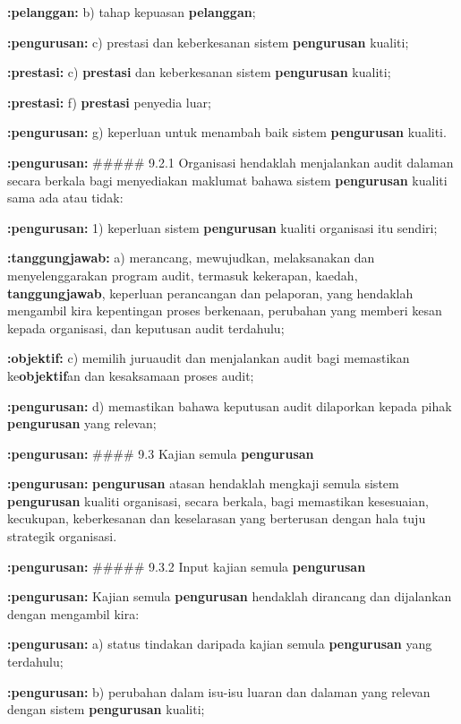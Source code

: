 \documentclass{article}
\begin{document}
\textbf{:pelanggan:} b) tahap kepuasan \textbf{pelanggan};

\textbf{:pengurusan:} c) prestasi dan keberkesanan sistem \textbf{pengurusan} kualiti;

\textbf{:prestasi:} c) \textbf{prestasi} dan keberkesanan sistem \textbf{pengurusan} kualiti;

\textbf{:prestasi:} f) \textbf{prestasi} penyedia luar;

\textbf{:pengurusan:} g) keperluan untuk menambah baik sistem \textbf{pengurusan} kualiti.

\textbf{:pengurusan:} \#\#\#\#\# 9.2.1 Organisasi hendaklah menjalankan audit dalaman secara berkala bagi menyediakan
maklumat bahawa sistem \textbf{pengurusan} kualiti sama ada atau tidak:

\textbf{:pengurusan:} 1) keperluan sistem \textbf{pengurusan} kualiti organisasi itu sendiri;

\textbf{:tanggungjawab:} a) merancang, mewujudkan, melaksanakan dan menyelenggarakan program audit,
termasuk kekerapan, kaedah, \textbf{tanggungjawab}, keperluan perancangan dan pelaporan,
yang hendaklah mengambil kira kepentingan proses berkenaan, perubahan yang
memberi kesan kepada organisasi, dan keputusan audit terdahulu;

\textbf{:objektif:} c) memilih juruaudit dan menjalankan audit bagi memastikan ke\textbf{objektif}an dan
kesaksamaan proses audit;

\textbf{:pengurusan:} d) memastikan bahawa keputusan audit dilaporkan kepada pihak \textbf{pengurusan} yang relevan;

\textbf{:pengurusan:} \#\#\#\# 9.3 Kajian semula \textbf{pengurusan}

\textbf{:pengurusan:} \textbf{pengurusan} atasan hendaklah mengkaji semula sistem \textbf{pengurusan} kualiti organisasi, secara
berkala, bagi memastikan kesesuaian, kecukupan, keberkesanan dan keselarasan yang
berterusan dengan hala tuju strategik organisasi.

\textbf{:pengurusan:} \#\#\#\#\# 9.3.2 Input kajian semula \textbf{pengurusan}

\textbf{:pengurusan:} Kajian semula \textbf{pengurusan} hendaklah dirancang dan dijalankan dengan mengambil kira:

\textbf{:pengurusan:} a) status tindakan daripada kajian semula \textbf{pengurusan} yang terdahulu;

\textbf{:pengurusan:} b) perubahan dalam isu-isu luaran dan dalaman yang relevan dengan sistem \textbf{pengurusan}
kualiti;
\end{document}
